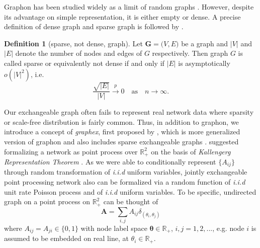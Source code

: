 \documentclass[12pt]{article}
\theoremstyle{definition}
\newtheorem{definition}{Definition}[section]
\begin{document}
Graphon has been studied widely as a limit of random graphs \citep{lovasz2006limits}. However, despite its advantage on simple representation, it is either empty or dense. A precise definition of dense graph and sparse graph is followed by \cite{veitch2015class}. 
\begin{definition}[sparse, not dense, graph]
Let $\mathbf{G} = \big(  V, E \big)$ be a graph and $|V|$ and $|E|$ denote the number of nodes and edges of $G$ respectively. Then graph $G$ is called sparse or equivalently not dense if and only if $|E|$ is asymptotically $o(|V|^2)$, i.e.
\begin{equation}
\frac{\sqrt{|E|}}{|V|} \xrightarrow{p} 0 \quad \mbox{as} \quad n \rightarrow \infty.
\end{equation}
\end{definition}
Our exchangeable graph often fails to represent real network data where sparsity or scale-free distribution is fairly common. Thus, in addition to graphon, we introduce a concept of \textit{graphex}, first proposed by \cite{veitch2015class}, which is more generalized version of graphon and also includes sparse exchangeable graphs \citep{caron2014sparse}.  \cite{caron2014sparse} suggested formalizing a network as point process over $\mathbb{R}^2_{+}$ on the basis of \textit{Kallengerg Representation Theorem} \citep{kallenberg1990exchangeable}. As we were able to conditionally represent $\{ A_{ij} \}$ through random transformation of \textit{i.i.d} uniform variables, jointly exchangeable point processing network also can be formalized via a random function of \textit{i.i.d} unit rate Poisson process and of \textit{i.i.d} uniform variables. 
To be specific, undirected graph on a point process on $\mathbb{R}^2_{+}$ can be thought of 
\begin{equation}
\mathbf{A} = \sum\limits_{i,j} A_{ij} \delta_{( \theta_{i}, \theta_{j})} 
\end{equation}	
where $A_{ij} = A_{ji} \in \{ 0 , 1  \}$ with node label space $\mathbf{\theta} \in \mathbb{R}_{+}$, $i,j = 1,2,...$, e.g.  node $i$ is assumed to be embedded on real line, at $\theta_{i} \in \mathbb{R}_{+}$. 	
				
\end{document}
